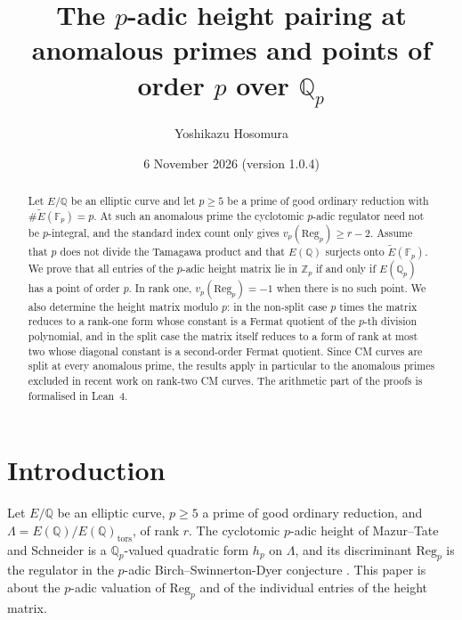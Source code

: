 \documentclass[11pt,a4paper]{amsart}
\newcommand{\Q}{\mathbb{Q}}
\newcommand{\Qp}{\mathbb{Q}_p}
\newcommand{\Zp}{\mathbb{Z}_p}
\newcommand{\Fp}{\mathbb{F}_p}
\newcommand{\Reg}{\mathrm{Reg}}
\newcommand{\Et}{\widetilde{E}}
\newcommand{\Lam}{\Lambda}
\theoremstyle{plain}
\theoremstyle{definition}
\theoremstyle{remark}
\begin{document}
\title[$p$-adic heights at anomalous primes]{The $p$-adic height pairing at anomalous primes and points of order $p$ over $\Qp$}
\author{Yoshikazu Hosomura}
\address{Independent researcher, Japan}
\date{6 November 2026 (version 1.0.4)}

\begin{abstract}
Let $E/\Q$ be an elliptic curve and let $p\ge5$ be a prime of good ordinary reduction with $\#\Et(\Fp)=p$. At such an anomalous prime the cyclotomic $p$-adic regulator need not be $p$-integral, and the standard index count only gives $v_p(\Reg_p)\ge r-2$. Assume that $p$ does not divide the Tamagawa product and that $E(\Q)$ surjects onto $\Et(\Fp)$. We prove that all entries of the $p$-adic height matrix lie in $\Zp$ if and only if $E(\Qp)$ has a point of order $p$. In rank one, $v_p(\Reg_p)=-1$ when there is no such point. We also determine the height matrix modulo $p$: in the non-split case $p$ times the matrix reduces to a rank-one form whose constant is a Fermat quotient of the $p$-th division polynomial, and in the split case the matrix itself reduces to a form of rank at most two whose diagonal constant is a second-order Fermat quotient. Since CM curves are split at every anomalous prime, the results apply in particular to the anomalous primes excluded in recent work on rank-two CM curves. The arithmetic part of the proofs is formalised in Lean~4.
\end{abstract}

\maketitle

\section{Introduction}

Let $E/\Q$ be an elliptic curve, $p\ge5$ a prime of good ordinary reduction, and $\Lam=E(\Q)/E(\Q)_{\mathrm{tors}}$, of rank $r$. The cyclotomic $p$-adic height of Mazur--Tate and Schneider \cite{MT91,Sch85} is a $\Qp$-valued quadratic form $h_p$ on $\Lam$, and its discriminant $\Reg_p$ is the regulator in the $p$-adic Birch--Swinnerton-Dyer conjecture \cite{MTT,BMS}. This paper is about the $p$-adic valuation of $\Reg_p$ and of the individual entries of the height matrix.
\end{document}
